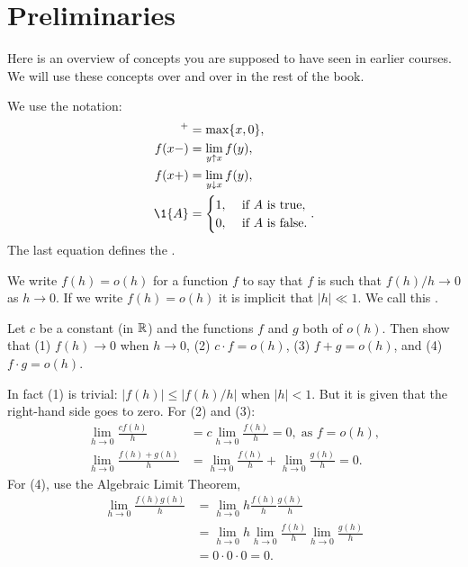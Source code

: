 \section{Preliminaries}
\label{sec:preliminaries}


Here is an overview of concepts you are supposed to have seen in earlier courses.
We will use these concepts over and over in the rest of the book.




We use the notation:
 \begin{align*}
 [x]^+ &= \max\{x, 0\}, \\
 f(x-) &= \lim_{y\uparrow x} f(y),\\
 f(x+) &= \lim_{y\downarrow x} f(y),\\
 \1{A} &=
 \begin{cases}
 1, & \text{ if $A$ is true}, \\
 0, & \text{ if $A$ is false}.
 \end{cases}.
\end{align*}
The last equation defines the .


We write $f(h)=o(h)$ for a function $f$ to say that $f$ is such that $f(h)/h \to 0$ as $h\to 0$.
If we write $f(h) = o(h)$ it is implicit that $|h| \ll 1$.
We call this .
\begin{exercise}
 Let $c$ be a constant (in $\mathbb{R}$) and the functions $f$ and $g$ both of $o(h)$. Then show that (1) $f(h) \to 0$ when $h\to 0$, (2) $c\cdot f = o(h)$, (3) $f+g=o(h)$, and (4) $f\cdot g=o(h)$. 
\begin{solution}
 In fact (1) is trivial: $|f(h)| \leq |f(h)/h|$ when $|h| < 1$.
 But it is given that the right-hand side goes to zero.
 For (2) and (3):
\begin{align*}
\lim_{h\to 0} \frac{c f(h)}{h} &= c \lim_{h\to 0} \frac{f(h)}{h} = 0, \; \text{as } f = o(h), \\
\lim_{h\to 0} \frac{f(h) + g(h)} h &= \lim_{h\to 0} \frac{f(h)} h + \lim_{h\to 0} \frac{g(h)} h = 0.
\end{align*}
For (4), use the Algebraic Limit Theorem,
\begin{align*}
\lim_{h\to 0} \frac{f(h)g(h)}{h} &= \lim_{h\to 0} h \frac{f(h)}{h} \frac{g(h)}{h} \\
&= \lim_{h\to 0} h \lim_{h\to 0} \frac{f(h)}{h} \lim_{h\to 0} \frac{g(h)}{h} \\
&= 0 \cdot 0 \cdot 0 = 0.
\end{align*}
\end{solution}
\end{exercise}


